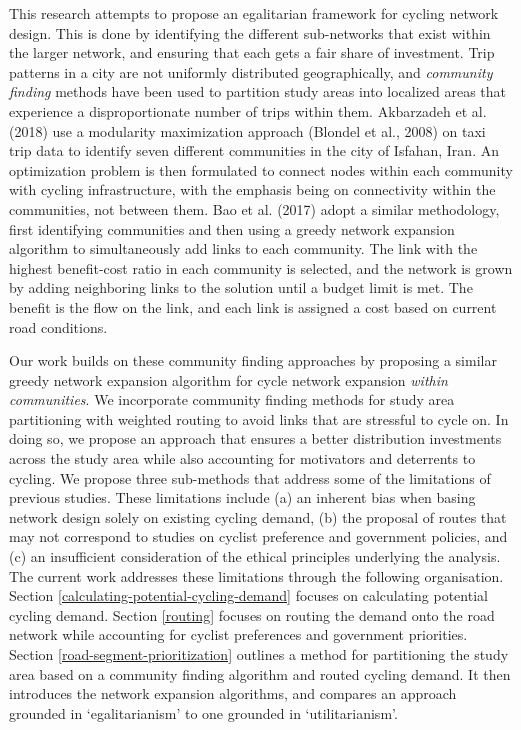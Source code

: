\documentclass[
]{article}
\begin{document}
This research attempts to propose an egalitarian framework for cycling
network design. This is done by identifying the different sub-networks
that exist within the larger network, and ensuring that each gets a fair
share of investment. Trip patterns in a city are not uniformly
distributed geographically, and \emph{community finding} methods have been
used to partition study areas into localized areas that experience a
disproportionate number of trips within them. Akbarzadeh et al. (2018)
use a modularity maximization approach (Blondel et al., 2008) on taxi trip
data to identify seven different communities in the city of Isfahan, Iran.
An optimization problem is then formulated to connect nodes within each
community with cycling infrastructure, with the emphasis being on
connectivity within the communities, not between them. Bao et al. (2017)
adopt a similar methodology, first identifying communities and then
using a greedy network expansion algorithm to simultaneously add links
to each community. The link with the highest benefit-cost ratio in each
community is selected, and the network is grown by adding neighboring
links to the solution until a budget limit is met. The benefit is the
flow on the link, and each link is assigned a cost based on current road
conditions.

Our work builds on these community finding approaches by proposing a
similar greedy network expansion algorithm for cycle network expansion
\emph{within communities}. We incorporate community finding methods for study
area partitioning with weighted routing to avoid links that are
stressful to cycle on. In doing so, we propose an approach that ensures a better distribution
investments across the study area while also accounting for motivators and deterrents to cycling.
We propose three sub-methods that address some of the limitations of previous
studies. These limitations include (a) an inherent bias when basing network
design solely on existing cycling demand, (b) the proposal of routes that may
not correspond to studies on cyclist preference and government policies,
and (c) an insufficient consideration of the ethical principles underlying
the analysis. The current work addresses these limitations through the following organisation. Section \ref{calculating-potential-cycling-demand}
focuses on calculating potential cycling demand. Section \ref{routing}
focuses on routing the demand onto the road network while accounting for
cyclist preferences and government priorities. Section
\ref{road-segment-prioritization} outlines a method for partitioning the
study area based on a community finding algorithm and routed cycling
demand. It then introduces the network expansion algorithms, and compares an approach grounded in
`egalitarianism' to one grounded in `utilitarianism'.
\end{document}
